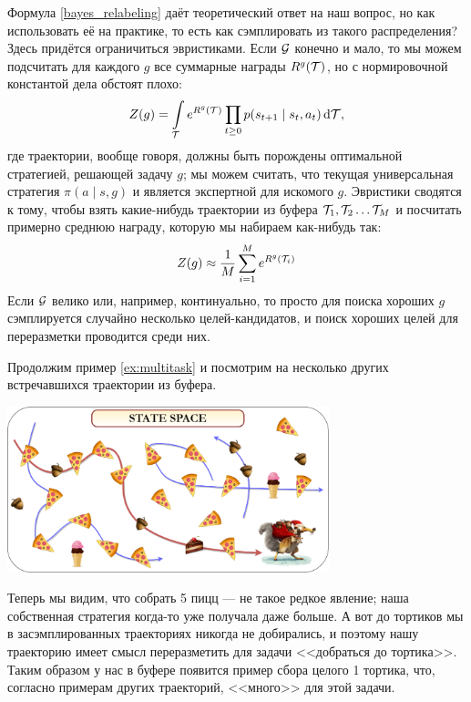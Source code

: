 Формула \eqref{bayes_relabeling} даёт теоретический ответ на наш вопрос, но как использовать её на практике, то есть как сэмплировать из такого распределения? Здесь придётся ограничиться эвристиками. Если $\mathcal{G}$ конечно и мало, то мы можем подсчитать для каждого $g$ все суммарные награды $R^g(\mathcal{T})$, но с нормировочной константой дела обстоят плохо: 
$$Z(g) = \int\limits_{\mathcal{T}} e^{R^g(\mathcal{T})} \prod_{t \ge 0}p(s_{t+1} \mid s_t, a_t) \mathop{}\!\mathrm{d} \mathcal{T},$$
где траектории, вообще говоря, должны быть порождены оптимальной стратегией, решающей задачу $g$; мы можем считать, что текущая универсальная стратегия $\pi(a \mid s, g)$ и является экспертной для искомого $g$. Эвристики сводятся к тому, чтобы взять какие-нибудь траектории из буфера $\mathcal{T}_1, \mathcal{T}_2 \dots \mathcal{T}_M$ и посчитать примерно среднюю награду, которую мы набираем как-нибудь так:
$$Z(g) \approx \frac{1}{M} \sum_{i = 1}^M e^{R^g(\mathcal{T}_i)}$$
Если $\mathcal{G}$ велико или, например, континуально, то просто для поиска хороших $g$ сэмплируется случайно несколько целей-кандидатов, и поиск хороших целей для переразметки проводится среди них.

\begin{example}
Продолжим пример \ref{ex:multitask} и посмотрим на несколько других встречавшихся траектории из буфера.
\begin{center}
    \includegraphics[width=0.7\textwidth]{Images/MultiTask3}
\end{center}
Теперь мы видим, что собрать 5 пицц --- не такое редкое явление; наша собственная стратегия когда-то уже получала даже больше. А вот до тортиков мы в засэмплированных траекториях никогда не добирались, и поэтому нашу траекторию имеет смысл переразметить для задачи <<добраться до тортика>>. Таким образом у нас в буфере появится пример сбора целого 1 тортика, что, согласно примерам других траекторий, <<много>> для этой задачи.
\end{example}